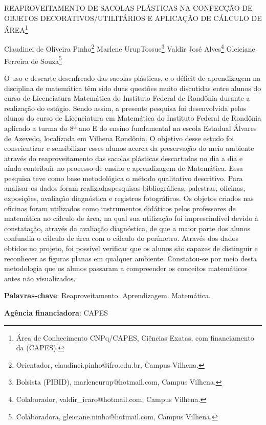 \documentclass[article,12pt,onesidea,4paper,english,brazil]{abntex2}
\begin{document}
	
	
	\frenchspacing 
	
	\begin{center}
		\LARGE REAPROVEITAMENTO DE SACOLAS PLÁSTICAS NA CONFECÇÃO DE OBJETOS DECORATIVOS/UTILITÁRIOS E APLICAÇÃO DE CÁLCULO DE ÁREA\footnote{Área de Conhecimento CNPq/CAPES, Ciências Exatas, com financiamento da (CAPES).}
		
		\normalsize
		Claudinei de Oliveira Pinho\footnote{Orientador, claudinei.pinho@ifro.edu.br, Campus Vilhena.} 
		Marlene UrupTossue\footnote{Bolsista (PIBID), marleneurup@hotmail.com, Campus Vilhena.} 
		Valdir José Alves\footnote{Colaborador, valdir\_icaro@hotmail.com, Campus Vilhena.} 
		Gleiciane Ferreira de Souza\footnote{Colaboradora, gleiciane.ninha@hotmail.com, Campus Vilhena.} 
	\end{center}
	
	\noindent O uso e descarte desenfreado das sacolas plásticas, e o déficit de aprendizagem na disciplina de matemática têm sido duas questões muito discutidas entre alunos do curso de Licenciatura Matemática do Instituto Federal de Rondônia durante a realização do estágio. Sendo assim, a presente pesquisa foi desenvolvida pelos alunos do curso de Licenciatura em Matemática do Instituto Federal de Rondônia aplicado a turma do 8º ano E do ensino fundamental na escola Estadual Álvares de Azevedo, localizada em Vilhena Rondônia. O objetivo desse estudo foi conscientizar e sensibilizar esses alunos acerca da preservação do meio ambiente através do reaproveitamento das sacolas plásticas descartadas no dia a dia e ainda contribuir no processo de ensino e aprendizagem de Matemática. Essa pesquisa teve como base metodológica o método qualitativo descritivo. Para analisar os dados foram realizadaspesquisas bibliográficas, palestras, oficinas, exposições, avaliação diagnóstica e registros fotográficos. Os objetos criados nas oficinas foram utilizados como instrumentos didáticos pelos professores de matemática no cálculo de área, na qual sua utilização foi imprescindível devido à constatação, através da avaliação diagnóstica, de que a maior parte dos alunos confundia o cálculo de área com o cálculo do perímetro. Através dos dados obtidos no projeto, foi possível verificar que os alunos são capazes de distinguir e reconhecer as figuras planas em qualquer ambiente. Constatou-se por meio desta metodologia que os alunos passaram a compreender os conceitos matemáticos antes não visualizados.
	
	\vspace{\onelineskip}
	
	\noindent
	\textbf{Palavras-chave}: Reaproveitamento. Aprendizagem. Matemática.
	
	\noindent
	\textbf{Agência financiadora}: CAPES
	
\end{document}
